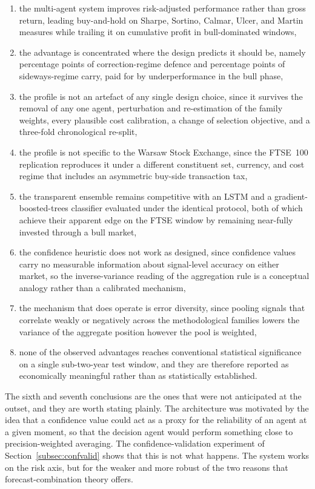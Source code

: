 \begin{enumerate}
    \item the multi-agent system improves risk-adjusted performance rather than gross return, leading buy-and-hold on Sharpe, Sortino, Calmar, Ulcer, and Martin measures while trailing it on cumulative profit in bull-dominated windows,
    \item the advantage is concentrated where the design predicts it should be, namely \CorrectionDefencePP{} percentage points of correction-regime defence and \SidewaysExcessPP{} percentage points of sideways-regime carry, paid for by underperformance in the bull phase,
    \item the profile is not an artefact of any single design choice, since it survives the removal of any one agent, perturbation and re-estimation of the family weights, every plausible cost calibration, a change of selection objective, and a three-fold chronological re-split,
    \item the profile is not specific to the Warsaw Stock Exchange, since the FTSE~100 replication reproduces it under a different constituent set, currency, and cost regime that includes an asymmetric buy-side transaction tax,
    \item the transparent ensemble remains competitive with an LSTM and a gradient-boosted-trees classifier evaluated under the identical protocol, both of which achieve their apparent edge on the FTSE window by remaining near-fully invested through a bull market,
    \item the confidence heuristic does not work as designed, since confidence values carry no measurable information about signal-level accuracy on either market, so the inverse-variance reading of the aggregation rule is a conceptual analogy rather than a calibrated mechanism,
    \item the mechanism that does operate is error diversity, since pooling signals that correlate weakly or negatively across the methodological families lowers the variance of the aggregate position however the pool is weighted,
    \item none of the observed advantages reaches conventional statistical significance on a single sub-two-year test window, and they are therefore reported as economically meaningful rather than as statistically established.
\end{enumerate}

The sixth and seventh conclusions are the ones that were not anticipated at the outset, and they are worth stating plainly. The architecture was motivated by the idea that a confidence value could act as a proxy for the reliability of an agent at a given moment, so that the decision agent would perform something close to precision-weighted averaging. The confidence-validation experiment of Section~\ref{subsec:confvalid} shows that this is not what happens. The system works on the risk axis, but for the weaker and more robust of the two reasons that forecast-combination theory offers.


